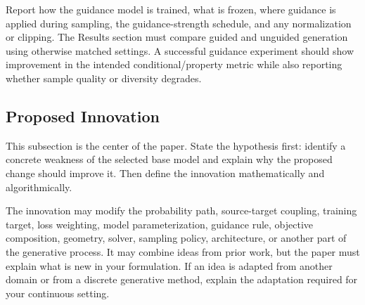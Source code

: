 \documentclass{article}
\begin{document}
Report how the guidance model is trained, what is frozen, where guidance is applied during sampling, the guidance-strength schedule, and any normalization or clipping. The Results section must compare guided and unguided generation using otherwise matched settings. A successful guidance experiment should show improvement in the intended conditional/property metric while also reporting whether sample quality or diversity degrades.

\subsection{Proposed Innovation}

This subsection is the center of the paper. State the hypothesis first: identify a concrete weakness of the selected base model and explain why the proposed change should improve it. Then define the innovation mathematically and algorithmically.

The innovation may modify the probability path, source-target coupling, training target, loss weighting, model parameterization, guidance rule, objective composition, geometry, solver, sampling policy, architecture, or another part of the generative process. It may combine ideas from prior work, but the paper must explain what is new in your formulation. If an idea is adapted from another domain or from a discrete generative method, explain the adaptation required for your continuous setting.
\end{document}
